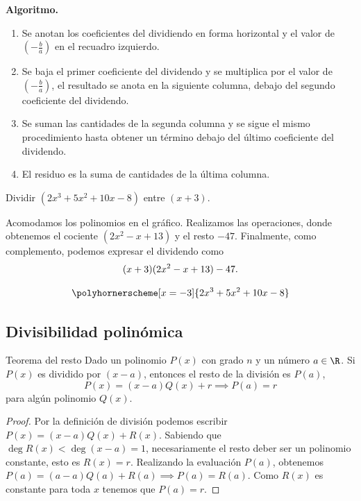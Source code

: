 \textbf{Algoritmo.}
\begin{enumerate}
    \item Se anotan los coeficientes del dividiendo en forma horizontal y el valor de $\left(-\frac{b}{a}\right)$ en el recuadro izquierdo.
    \item Se baja el primer coeficiente del dividendo y se multiplica por el valor de $\left(-\frac{b}{a}\right)$, el resultado se anota en la siguiente columna, debajo del segundo coeficiente del dividendo.
    \item Se suman las cantidades de la segunda columna y se sigue el mismo procedimiento hasta obtener un término debajo del último coeficiente del dividendo.
    \item El residuo es la suma de cantidades de la última columna.
\end{enumerate}

\begin{example}
    Dividir $(2x^3 + 5x^2 + 10x - 8)$ entre $(x + 3)$.
\end{example}
\begin{multicols}{2}
    \begin{solution}
        Acomodamos los polinomios en el gráfico.
        Realizamos las operaciones, donde obtenemos el cociente $(2x^2 - x + 13)$ y el resto $-47$.
        Finalmente, como complemento, podemos expresar el dividendo como
        \[
            (x + 3)(2x^2 - x + 13) - 47. \qedhere
        \]
    \end{solution}
    \[
        \polyhornerscheme[x=-3]{2x^3 + 5x^2 + 10x - 8}
    \]
\end{multicols}


\subsection{Divisibilidad polinómica}

\begin{theorem.tcb}{Teorema del resto}{}
    Dado un polinomio $P(x)$ con grado $n$ y un número $a \in \R$.
    Si $P(x)$ es dividido por $(x - a)$, entonces el resto de la división es $P(a)$, \ie
    \[
        P(x) = (x - a)Q(x) + r \implies P(a) = r
    \]
    para algún polinomio $Q(x)$.
\end{theorem.tcb}
\begin{proof}
    Por la definición de división podemos escribir $P(x) = (x - a)Q(x) + R(x)$.
    Sabiendo que $\deg R(x) < \deg(x - a) = 1$, necesariamente el resto deber ser un polinomio constante, esto es $R(x) = r$.
    Realizando la evaluación $P(a)$, obtenemos $P(a) = (a - a)Q(a) + R(a) \implies P(a) = R(a)$.
    Como $R(x)$ es constante para toda $x$ tenemos que $P(a) = r$.
\end{proof}

